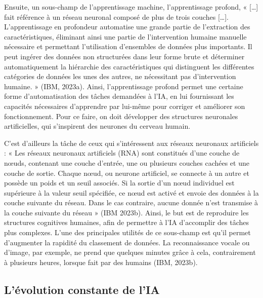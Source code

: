 \documentclass[
  letterpaper,
  DIV=11,
  numbers=noendperiod,
  oneside]{scrreprt}
\begin{document}
Ensuite, un sous-champ de l'apprentissage machine, l'apprentissage
profond, « {[}\ldots{]} fait référence à un réseau neuronal composé de
plus de trois couches {[}\ldots{]}. L'apprentissage en profondeur
automatise une grande partie de l'extraction des caractéristiques,
éliminant ainsi une partie de l'intervention humaine manuelle nécessaire
et permettant l'utilisation d'ensembles de données plus importants. Il
peut ingérer des données non structurées dans leur forme brute et
déterminer automatiquement la hiérarchie des caractéristiques qui
distinguent les différentes catégories de données les unes des autres,
ne nécessitant pas d'intervention humaine. » (IBM, 2023a). Ainsi,
l'apprentissage profond permet une certaine forme d'automatisation des
tâches demandées à l'IA, en lui fournissant les capacités nécessaires
d'apprendre par lui-même pour corriger et améliorer son fonctionnement.
Pour ce faire, on doit développer des structures neuronales
artificielles, qui s'inspirent des neurones du cerveau humain.

C'est d'ailleurs la tâche de ceux qui s'intéressent aux réseaux
neuronaux artificiels : « Les réseaux neuronaux artificiels (RNA) sont
constitués d'une couche de nœuds, contenant une couche d'entrée, une ou
plusieurs couches cachées et une couche de sortie. Chaque nœud, ou
neurone artificiel, se connecte à un autre et possède un poids et un
seuil associés. Si la sortie d'un nœud individuel est supérieure à la
valeur seuil spécifiée, ce nœud est activé et envoie des données à la
couche suivante du réseau. Dans le cas contraire, aucune donnée n'est
transmise à la couche suivante du réseau » (IBM 2023b). Ainsi, le but
est de reproduire les structures cognitives humaines, afin de permettre
à l'IA d'accomplir des tâches plus complexes. L'une des principales
utilités de ce sous-champ est qu'il permet d'augmenter la rapidité du
classement de données. La reconnaissance vocale ou d'image, par exemple,
ne prend que quelques minutes grâce à cela, contrairement à plusieurs
heures, lorsque fait par des humains (IBM, 2023b).

\hypertarget{luxe9volution-constante-de-lia}{%
\subsection{L'évolution constante de
l'IA}\label{luxe9volution-constante-de-lia}}
\end{document}
